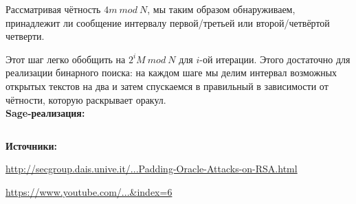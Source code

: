 \documentclass[12pt,a4paper]{scrartcl}
\begin{document}
Рассматривая чётность $4m\ mod\ N$, мы таким образом обнаруживаем, принадлежит ли сообщение интервалу первой/третьей или второй/четвёртой четверти.

Этот шаг легко обобщить на $2^iM\ mod\ N$ для $i$-ой итерации. Этого достаточно для реализации бинарного поиска: на каждом шаге мы делим интервал возможных открытых текстов на два и затем спускаемся в правильный в зависимости от чётности, которую раскрывает оракул.\\

\textbf{Sage-реализация:}

\inputminted[tabsize=4,obeytabs,fontsize=\footnotesize]{python3}{./RSA_scripts/parity_oracle.sage}

\textbf{Источники:}

\href{http://secgroup.dais.unive.it/wp-content/uploads/2012/11/Practical-Padding-Oracle-Attacks-on-RSA.html}{http://secgroup.dais.unive.it/...Padding-Oracle-Attacks-on-RSA.html}

\href{https://www.youtube.com/watch?v=ibfb7\_-\_CGg\&list=PLLguubeCGWoaGFEDzduGmBhEgZ62p-Jqv\&index=6}{https://www.youtube.com/...\&index=6}
\end{document}
